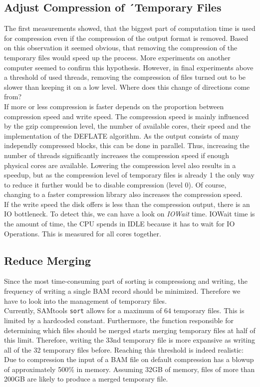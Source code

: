 \subsection{Adjust Compression of ´Temporary Files}
The first measurements showed, that the biggest part of computation time is used for compression even if the compression of the output format is removed. Based on this observation it seemed obvious, that removing the compression of the temporary files would speed up the process. More experiments on another computer seemed to confirm this hypothesis. However, in final experiments above a threshold of used threads, removing the compression of files turned out to be slower than keeping it on a low level. Where does this change of directions come from? \\
If more or less compression is faster depends on the proportion between compression speed and write speed. The compression speed is mainly influenced by the gzip compression level, the number of available cores, their speed and the implementation of the DEFLATE algorithm. As the output consists of many independly compressed blocks, this can be done in parallel. Thus, increasing the number of threads significantly increases the compression speed if enough physical cores are available. Lowering the compression level also results in a speedup, but as the compression level of temporary files is already 1 the only way to reduce it further would be to disable compression (level 0). Of course, changing to a faster compression library also increases the compression speed. \\
If the write speed the disk offers is less than the compression output, there is an IO bottleneck. To detect this, we can have a look on \textit{IOWait} time. IOWait time is the amount of time, the CPU spends in IDLE because it has to wait for IO Operations. This is measured for all cores together. 

\subsection{Reduce Merging}
Since the most time-consuming part of sorting is compressiong and writing, the frequency of writing a single BAM record should be minimized. Therefore we have to look into the management of temporary files. \\
Currently, SAMtools \texttt{sort} allows for a maximum of 64 temporary files. This is limited by a hardcoded constant. Furthermore, the function responsible for determining which files should be merged starts merging temporary files at half of this limit. Therefore, writing the 33nd temporary file is more expansive as writing all of the 32 temporary files before. Reaching this threshold is indeed realistic: Due to compression the input of a BAM file on default compression has a blowup of approximately 500\% in memory. Assuming 32GB of memory, files of more than 200GB are likely to produce a merged temporary file.